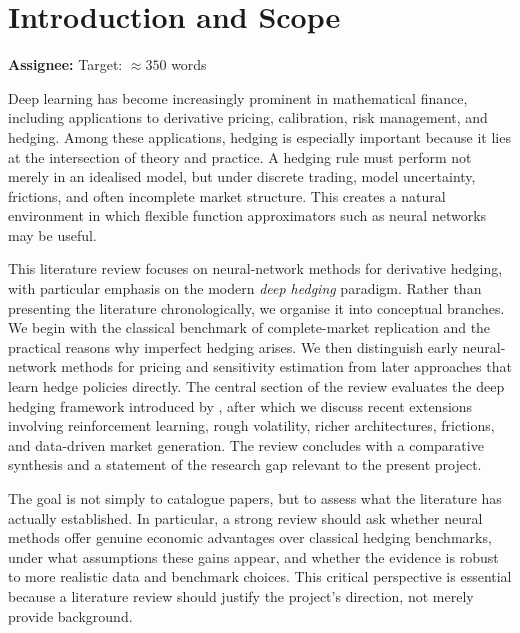 \documentclass[12pt, a4paper]{article}
\begin{document}
\section{Introduction and Scope}
\label{sec:intro}

\begin{assignbox}
\textbf{Assignee:} \underline{\hspace{4cm}} \quad Target: $\approx 350$ words
\end{assignbox}


Deep learning has become increasingly prominent in mathematical finance, including
applications to derivative pricing, calibration, risk management, and hedging. Among
these applications, hedging is especially important because it lies at the intersection
of theory and practice. A hedging rule must perform not merely in an idealised model,
but under discrete trading, model uncertainty, frictions, and often incomplete market
structure. This creates a natural environment in which flexible function approximators
such as neural networks may be useful.

This literature review focuses on neural-network methods for derivative hedging, with
particular emphasis on the modern \emph{deep hedging} paradigm. Rather than presenting
the literature chronologically, we organise it into conceptual branches. We begin with
the classical benchmark of complete-market replication and the practical reasons why
imperfect hedging arises. We then distinguish early neural-network methods for pricing
and sensitivity estimation from later approaches that learn hedge policies directly.
The central section of the review evaluates the deep hedging framework introduced by
\citet{BuehlerEtAl2019}, after which we discuss recent extensions involving
reinforcement learning, rough volatility, richer architectures, frictions, and
data-driven market generation. The review concludes with a comparative synthesis and a
statement of the research gap relevant to the present project.

The goal is not simply to catalogue papers, but to assess what the literature has
actually established. In particular, a strong review should ask whether neural methods
offer genuine economic advantages over classical hedging benchmarks, under what
assumptions these gains appear, and whether the evidence is robust to more realistic
data and benchmark choices. This critical perspective is essential because a literature
review should justify the project's direction, not merely provide background.
\end{document}
